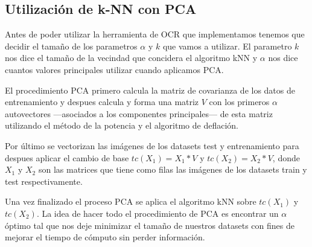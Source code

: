 
\subsection{Utilización de k-NN con PCA}

Antes de poder utilizar la herramienta de OCR que implementamos tenemos que decidir el tamaño de los parametros $\alpha$ y $k$ que vamos a utilizar. El parametro $k$ nos dice el tamaño de la vecindad que concidera el algoritmo kNN y $\alpha$ nos dice cuantos valores principales utilizar cuando aplicamos PCA. \par
\indent El procedimiento PCA primero calcula la matriz de covarianza de los datos de entrenamiento y despues calcula y forma una matriz $V$ con los primeros $\alpha$ autovectores ---asociados a los componentes principales--- de esta matriz utilizando el método de la potencia y el algoritmo de deflación. \par
\indent Por último se vectorizan las imágenes de los datasets test y entrenamiento para despues aplicar el cambio de base $tc(X_{1})=X_{1}*V$ y $tc(X_{2})=X_{2}*V$, donde $X_{1}$ y $X_{2}$ son las matrices que tiene como filas las imágenes de los datasets train y test respectivamente. \par
\indent Una vez finalizado el proceso PCA se aplica el algoritmo kNN sobre  $tc(X_{1})$ y $tc(X_{2})$. La idea de hacer todo el procedimiento de PCA es encontrar un $\alpha$ óptimo tal que nos deje minimizar el tamaño de nuestros datasets con fines de mejorar el tiempo de cómputo sin perder información.\par
